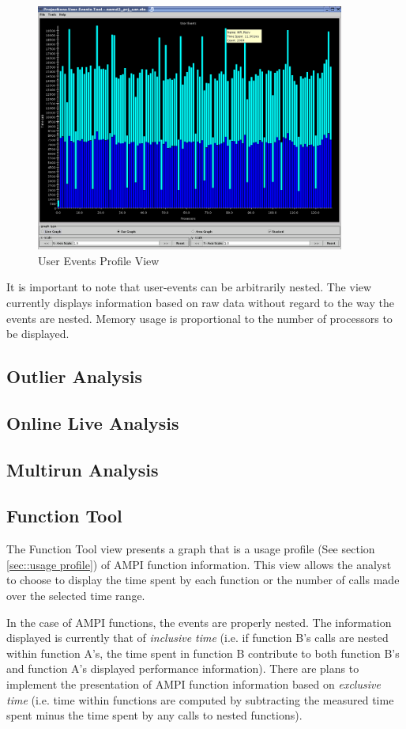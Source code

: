 \documentclass[10pt]{report}
\begin{document}
\begin{figure}[htb]
\center
\includegraphics[width=4.0in]{fig/apoa1_128_userEventsView}
\caption{User Events Profile View}
\label{user event profile}
\end{figure}

It is important to note that user-events can be arbitrarily
nested. The view currently displays information based on raw data
without regard to the way the events are nested. Memory usage is
proportional to the number of processors to be displayed.

\subsection{Outlier Analysis}


\subsection{ Online Live Analysis}

\subsection{Multirun Analysis}

\subsection{Function Tool}
\label{sec::function tool}
The Function Tool view presents a graph that is a usage profile (See
section \ref{sec::usage profile}) of AMPI function information. This
view allows the analyst to choose to display the time spent by each
function or the number of calls made over the selected time range.

In the case of AMPI functions, the events are properly nested. The
information displayed is currently that of {\em inclusive time}
(i.e. if function B's calls are nested within function A's, the time
spent in function B contribute to both function B's and function A's
displayed performance information). There are plans to implement the
presentation of AMPI function information based on {\em exclusive
time} (i.e. time within functions are computed by subtracting the
measured time spent minus the time spent by any calls to nested
functions).
\end{document}
